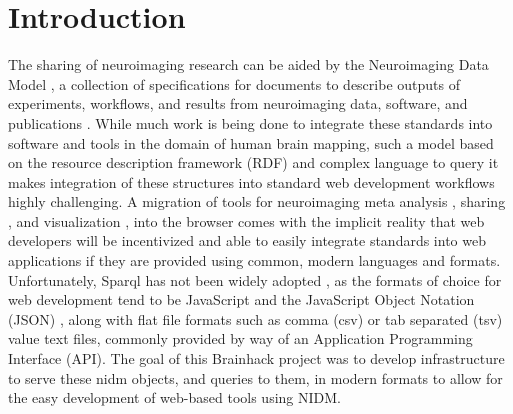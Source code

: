 \documentclass[twocolumn]{bmcart}%
\begin{document}
\section{Introduction}\label{introduction}
The sharing of neuroimaging research can be aided by the Neuroimaging Data Model \cite{noauthor_undated-jz} \cite{noauthor_undated-pr}, a collection of specifications for documents to describe outputs of experiments, workflows, and results from neuroimaging data, software, and publications \cite{noauthor_undated-jz}. While much work is being done to integrate these standards into software and tools in the domain of human brain mapping, such a model based on the resource description framework (RDF) \cite{noauthor_undated-hj} and complex language to query it \cite{noauthor_undated-cp} makes integration of these structures into standard web development workflows highly challenging. A migration of tools for neuroimaging meta analysis \cite{Yarkoni2011-rg}, sharing \cite{Gorgolewski2015-sf}, and visualization \cite{noauthor_undated-ca}, into the browser comes with the implicit reality that web developers will be incentivized and able to easily integrate standards into web applications if they are provided using common, modern languages and formats. Unfortunately, Sparql has not been widely adopted \cite{noauthor_undated-tz}, as the formats of choice for web development tend to be JavaScript and the JavaScript Object Notation (JSON) \cite{Wikipedia_contributors2015-on}, along with flat file formats such as comma (csv) or tab separated (tsv) value text files, commonly provided by way of an Application Programming Interface (API). The goal of this Brainhack project was to develop infrastructure to serve these nidm objects, and queries to them, in modern formats to allow for the easy development of web-based tools using NIDM.
\end{document}

